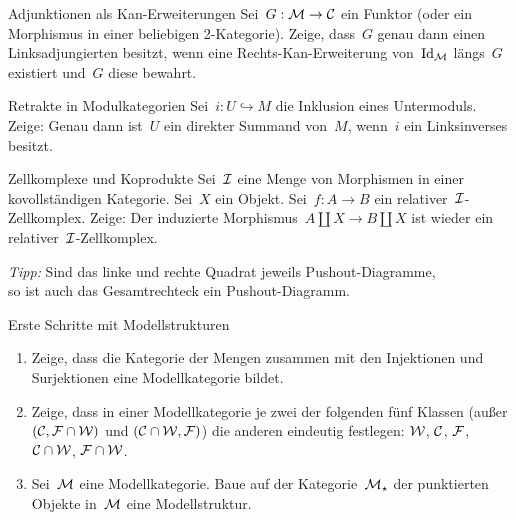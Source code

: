 \documentclass{uebblatt}
\begin{document}

\begin{aufgabe}{Adjunktionen als Kan-Erweiterungen}
Sei~$G : \mathcal{M} \to \mathcal{C}$ ein Funktor (oder ein Morphismus in einer beliebigen
2-Kategorie). Zeige, dass~$G$ genau dann einen Linksadjungierten besitzt, wenn
eine Rechts-Kan-Erweiterung von~$\mathrm{Id}_{\mathcal{M}}$ längs~$G$ existiert und~$G$ diese
bewahrt.
\end{aufgabe}

\begin{aufgabe}{Retrakte in Modulkategorien}
Sei~$i : U \hookrightarrow M$ die Inklusion eines Untermoduls. Zeige: Genau
dann ist~$U$ ein direkter Summand von~$M$, wenn~$i$ ein Linksinverses besitzt.
\end{aufgabe}

\begin{aufgabe}{Zellkomplexe und Koprodukte}
Sei~$\mathcal{I}$ eine Menge von Morphismen in einer kovollständigen Kategorie.
Sei~$X$ ein Objekt. Sei~$f : A \to B$ ein relativer~$\mathcal{I}$-Zellkomplex. Zeige: Der
induzierte Morphismus~$A \amalg X \to B \amalg X$ ist wieder ein
relativer~$\mathcal{I}$-Zellkomplex.

\emph{Tipp:} Sind das linke und rechte Quadrat jeweils Pushout-Diagramme, \\
so ist auch das Gesamtrechteck ein Pushout-Diagramm.
\end{aufgabe}

\begin{aufgabe}{Erste Schritte mit Modellstrukturen}
\begin{enumerate}
\item Zeige, dass die Kategorie der Mengen zusammen mit den Injektionen und
Surjektionen eine Modellkategorie bildet.
\item Zeige, dass in einer Modellkategorie je zwei der folgenden fünf Klassen
(außer $(\mathcal{C},\mathcal{F} \cap \mathcal{W})$ und $(\mathcal{C} \cap \mathcal{W},\mathcal{F})$) die anderen eindeutig
festlegen: $\mathcal{W}$, $\mathcal{C}$, $\mathcal{F}$, $\mathcal{C} \cap \mathcal{W}$, $\mathcal{F} \cap \mathcal{W}$.
\item Sei~$\mathcal{M}$ eine Modellkategorie. Baue auf der Kategorie~$\mathcal{M}_\star$ der
punktierten Objekte in~$\mathcal{M}$ eine Modellstruktur.
\end{enumerate}
\end{aufgabe}
\end{document}
